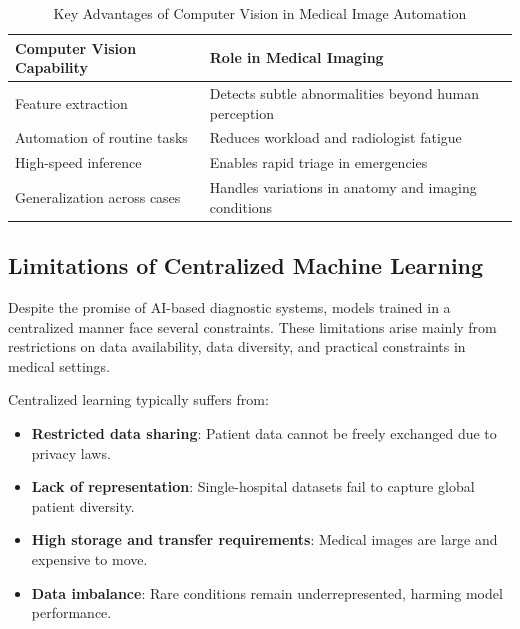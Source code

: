 \begin{table}[h!]
	\centering
	\renewcommand{\arraystretch}{1.3}
	\setlength{\tabcolsep}{10pt}
	
	\caption{\small Key Advantages of Computer Vision in Medical Image Automation}
	\label{tab:cv_roles}
	
	
	\begin{tabular}{|p{5cm} | p{8cm}|}
		\hline
		{\textbf{Computer Vision Capability}} &
		{\textbf{Role in Medical Imaging}} \\
		\hline
		
		Feature extraction &
		Detects subtle abnormalities beyond human perception \\
		\hline
		
		Automation of routine tasks &
		Reduces workload and radiologist fatigue \\
		\hline
		
		High-speed inference &
		Enables rapid triage in emergencies \\
		\hline
		
		Generalization across cases &
		Handles variations in anatomy and imaging conditions \\
		\hline
	\end{tabular}
\end{table}



\subsection{Limitations of Centralized Machine Learning}

Despite the promise of AI-based diagnostic systems, models trained in a centralized manner face several constraints. These limitations arise mainly from restrictions on data availability, data diversity, and practical constraints in medical settings.

Centralized learning typically suffers from:

\begin{itemize}
	\item \textbf{Restricted data sharing}: Patient data cannot be freely exchanged due to privacy laws.
	\item \textbf{Lack of representation}: Single-hospital datasets fail to capture global patient diversity.
	\item \textbf{High storage and transfer requirements}: Medical images are large and expensive to move.
	\item \textbf{Data imbalance}: Rare conditions remain underrepresented, harming model performance.
\end{itemize}

